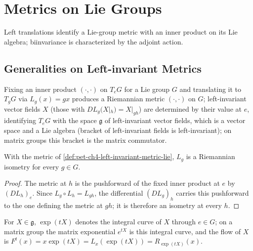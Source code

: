 \section{Metrics on Lie Groups}

Left translations identify a Lie-group metric with an inner product on its Lie
algebra; biinvariance is characterized by the adjoint action.

\subsection{Generalities on Left-invariant Metrics}

\begin{definition}
  \label{def:pet-ch4-left-invariant-metric-lie}


  Fixing an inner product $(\cdot,\cdot)$ on $T_eG$ for a Lie group $G$ and
  translating it to $T_gG$ via $L_g(x)=gx$ produces a Riemannian metric $(\cdot,\cdot)$
  on $G$; left-invariant vector fields $X$ (those with $DL_g(X|_h)=X|_{gh}$)
  are determined by their value at $e$, identifying $T_eG$ with the space
  $\mathfrak g$ of left-invariant vector fields, which is a vector space and a
  Lie algebra (bracket of left-invariant fields is left-invariant); on matrix
  groups this bracket is the matrix commutator.
\end{definition}

\begin{proposition}
  \label{prop:pet-ch4-left-translation-isometry}


  With the metric of \cref{def:pet-ch4-left-invariant-metric-lie}, $L_g$ is a
  Riemannian isometry for every $g\in G$.
\end{proposition}
\begin{proof}

  \sketch
  The metric at $h$ is the pushforward of the fixed inner product at $e$ by
  $(DL_h)_e$. Since $L_g\circ L_h=L_{gh}$, the differential $(DL_g)_h$ carries
  this pushforward to the one defining the metric at $gh$; it is therefore an
  isometry at every $h$.
\end{proof}

\begin{definition}
  \label{def:pet-ch4-lie-algebra-exp}


  For $X\in\mathfrak g$, $\exp(tX)$ denotes the integral curve of $X$ through
  $e\in G$; on a matrix group the matrix exponential $e^{tX}$ is this integral
  curve, and the flow of $X$ is $F^t(x)=x\exp(tX)=L_x(\exp(tX))=R_{\exp(tX)}(x)$.
\end{definition}

